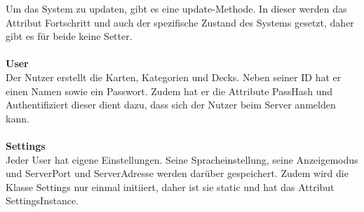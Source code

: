 \documentclass[fontsize=12pt,paper=a4,twoside]{scrartcl}
\begin{document}
Um das System zu updaten, gibt es eine update-Methode. In dieser werden das Attribut Fortschritt und auch der spezifische Zustand des Systems gesetzt, daher gibt es für beide keine Setter.
\\
\\
\textbf{User}\\ 
Der Nutzer erstellt die Karten, Kategorien und Decks. Neben seiner ID hat er einen Namen sowie ein Passwort. Zudem hat er die Attribute PassHash und Authentifiziert 
dieser dient dazu, dass sich der Nutzer beim Server anmelden kann. 
\\
\\
\textbf{Settings}\\
Jeder User hat eigene Einstellungen. Seine Spracheinstellung, seine Anzeigemodus und ServerPort und ServerAdresse werden darüber gespeichert.
Zudem wird die Klasse Settings nur einmal initiiert, daher ist sie static und hat das Attribut SettingsInstance.

\begin{landscape}
    \thispagestyle{empty}
    
\end{landscape}
\end{document}
